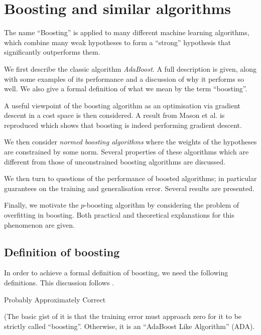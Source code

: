 

\chapter{Boosting and similar algorithms}

The name ``Boosting'' is applied to many different machine learning
algorithms, which combine many weak hypotheses to form a ``strong''
hypothesis that significantly outperforms them.

We first describe the classic algorithm \emph{AdaBoost}.  A full
description is given, along with some examples of its performance and
a discussion of why it performs so well.  We also give a formal
definition of what we mean by the term ``boosting''.

A useful viewpoint of the boosting algorithm as an optimisation via
gradient descent in a cost space is then considered.  A result from
Mason et al. \cite{Mason99} is reproduced which shows that boosting is
indeed performing gradient descent.

We then consider \emph{normed boosting algorithms} where the
weights of the hypotheses are constrained by some norm.  Several
properties of these algorithms which are different from those of
unconstrained boosting algorithms are discussed.

We then turn to questions of the performance of boosted algorithms; in
particular guarantees on the training and generalisation error.
Several results are presented.

Finally, we motivate the $p$-boosting algorithm by considering the
problem of overfitting in boosting.  Both practical and theoretical
explanations for this phenomenon are given.


\section{Definition of boosting}

In order to achieve a formal definition of boosting, we need the
following definitions.  This discussion follows \cite{Duffy99}.

Probably Approximately Correct

(The basic gist of it is that the training error must approach zero
for it to be strictly called ``boosting''.  Otherwise, it is an
``AdaBoost Like Algorithm'' (ADA).

